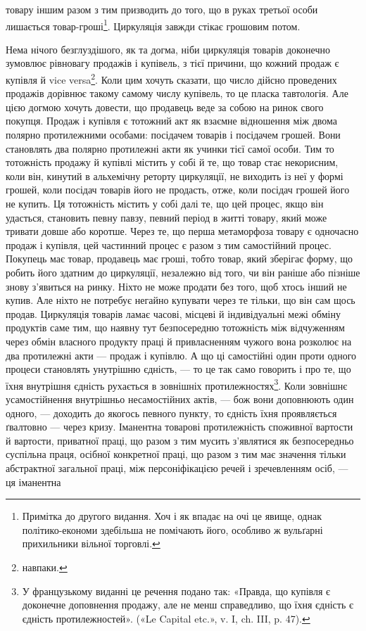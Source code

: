 \parcont{}  %
товару іншим разом з тим призводить до того, що в руках третьої
особи лишається товар-гроші\footnote{
Примітка до другого видання. Хоч і як впадає на очі це явище,
однак політико-економи здебільша не помічають його, особливо ж вульґарні
прихильники вільної торговлі.
}. Циркуляція завжди стікає грошовим
потом.

Нема нічого безглуздішого, як та догма, ніби циркуляція
товарів доконечно зумовлює рівновагу продажів і купівель, з
тієї причини, що кожний продаж є купівля й vice versa\footnote*{
навпаки. 
}. Коли
цим хочуть сказати, що число дійсно проведених продажів дорівнює
такому самому числу купівель, то це пласка тавтологія.
Але цією догмою хочуть довести, що продавець веде за собою
на ринок свого покупця. Продаж і купівля є тотожний акт як
взаємне відношення між двома полярно протилежними особами:
посідачем товарів і посідачем грошей. Вони становлять два полярно
протилежні акти як учинки тієї самої особи. Тим то тотожність
продажу й купівлі містить у собі й те, що товар стає некорисним,
коли він, кинутий в альхемічну реторту циркуляції, не
виходить із неї у формі грошей, коли посідач товарів його не продасть,
отже, коли посідач грошей його не купить. Ця тотожність
містить у собі далі те, що цей процес, якщо він удасться, становить
певну павзу, певний період в житті товару, який може тривати
довше або коротше. Через те, що перша метаморфоза товару є
одночасно продаж і купівля, цей частинний процес є разом з
тим самостійний процес. Покупець має товар, продавець має
гроші, тобто товар, який зберігає форму, що робить його здатним
до циркуляції, незалежно від того, чи він раніше або пізніше
знову з’явиться на ринку. Ніхто не може продати без того, щоб
хтось інший не купив. Але ніхто не потребує негайно купувати
через те тільки, що він сам щось продав. Циркуляція товарів
ламає часові, місцеві й індивідуальні межі обміну продуктів
саме тим, що наявну тут безпосередню тотожність між відчуженням
через обмін власного продукту праці й привласненням
чужого вона розколює на два протилежні акти — продаж і купівлю.
А що ці самостійні один проти одного процеси становлять
унутрішню єдність, — то це так само говорить і про те, що їхня
внутрішня єдність рухається в зовнішніх протилежностях\footnote*{
У французькому виданні це речення подано так: «Правда, що купівля
є доконечне доповнення продажу, але не менш справедливо, що
їхня єдність є єдність протилежностей». («Le Capital etc.», v. I, ch. III, p. 47).
}.
Коли зовнішнє усамостійнення внутрішньо несамостійних актів, —
бож вони доповнюють один одного, — доходить до якогось певного
пункту, то єдність їхня проявляється ґвалтовно — через
кризу. Іманентна товарові протилежність споживної вартости й
вартости, приватної праці, що разом з тим мусить з’являтися
як безпосередньо суспільна праця, осібної конкретної праці,
що разом з тим має значення тільки абстрактної загальної праці,
між персоніфікацією речей і зречевленням осіб, — ця іманентна
\parbreak{}  %
